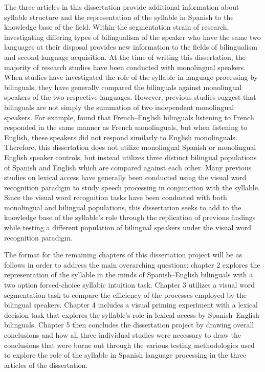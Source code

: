 The three articles in this dissertation provide additional information about syllable structure and the representation of the syllable in Spanish to the knowledge base of the field. Within the segmentation strain of research, investigating differing types of bilingualism of the speaker who have the same two languages at their disposal provides new information to the fields of bilingualism and second language acquisition. At the time of writing this dissertation, the majority of research studies have been conducted with monolingual speakers. When studies have investigated the role of the syllable in language processing by bilinguals, they have generally compared the bilinguals against monolingual speakers of the two respective languages. However, previous studies suggest that bilinguals are not simply the summation of two independent monolingual speakers. For example, %
found that French--English bilinguals listening to French responded in the same manner as French monolinguals, but when listening to English, these speakers did not respond similarly to English monolinguals. Therefore, this dissertation does not utilize monolingual Spanish or monolingual English speaker controls, but instead utilizes three distinct bilingual populations of Spanish and English which are compared against each other. %
Many previous studies on lexical access have generally been conducted using the visual word recognition paradigm to study speech processing in conjunction with the syllable. Since the visual word recognition tasks have been conducted with both monolingual and bilingual populations, this dissertation seeks to add to the knowledge base of the syllable’s role through the replication of previous findings while testing a different population of bilingual speakers under the visual word recognition paradigm.

The format for the remaining chapters of this dissertation project will be as follows in order to address the main overarching questions: chapter 2 explores the representation of the syllable in the minds of Spanish–English bilinguals with a two option forced-choice syllabic intuition task. Chapter 3 utilizes a visual word segmentation task to compare the efficiency of the processes employed by the bilingual speakers. Chapter 4 includes a visual priming experiment with a lexical decision task that explores the syllable’s role in lexical access by Spanish–English bilinguals. Chapter 5 then concludes the dissertation project by drawing overall conclusions and how all three individual studies were necessary to draw the conclusions that were borne out through the various testing methodologies used to explore the role of the syllable in Spanish language processing in the three articles of the dissertation.


